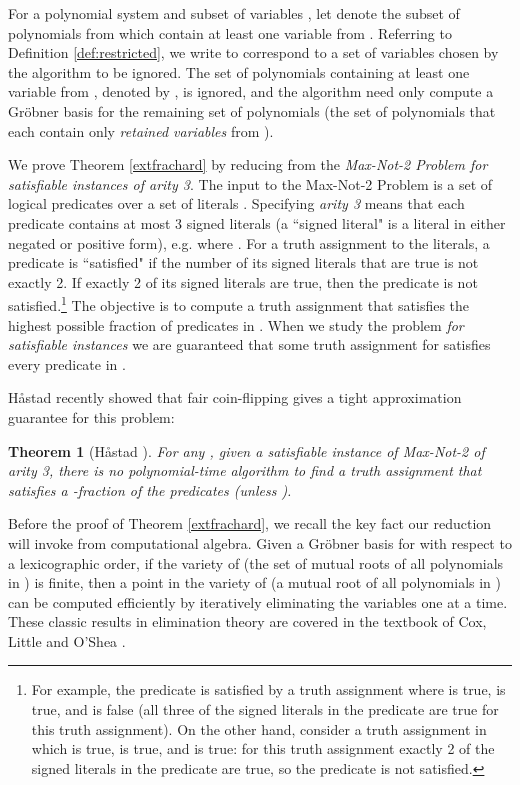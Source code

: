 \documentclass{article}
\newtheorem{thm}{Theorem}
\begin{document}
For a polynomial system  and subset of variables , let  denote the subset of polynomials from  which contain at least one variable from .
Referring to Definition \ref{def:restricted}, we write   to correspond to a set of variables chosen by the algorithm to be ignored. The set of polynomials containing at least one variable from , denoted by , is ignored, and the algorithm need only compute a Gr\"{o}bner basis for the remaining set of polynomials  (the set of polynomials that each contain only \textit{retained variables} from ). 




We prove Theorem \ref{extfrachard} by reducing from the \textit{Max-Not-2 Problem for satisfiable instances of arity 3}. The input to the Max-Not-2 Problem is a set of logical predicates  over a set of literals . Specifying \textit{arity 3} means that each predicate contains at most 3 signed literals (a ``signed literal" is a literal in either negated or positive form), e.g.  where . For a truth assignment to the literals, a predicate is ``satisfied" if the number of its signed literals that are true is not exactly 2. If exactly 2 of its signed literals are true, then the predicate is not satisfied.\footnote{For example, the predicate  is satisfied by a truth assignment where  is true,  is true, and  is false (all three of the signed literals in the predicate are true for this truth assignment). On the other hand, consider a truth assignment in which  is true,  is true, and  is true: for this truth assignment exactly 2 of the signed literals in the predicate are true, so the predicate is not satisfied.} The objective is to compute a truth assignment that satisfies the highest possible fraction of predicates in . When we study the problem \textit{for satisfiable instances} we are guaranteed that some truth assignment for  satisfies every predicate in .

H{\aa}stad recently showed that fair coin-flipping gives a tight approximation guarantee for this problem:
\begin{thm}[H{\aa}stad \cite{hast14}]\label{hastadnot2}
For any , given a satisfiable instance of Max-Not-2 of arity 3, there is no polynomial-time algorithm to find a truth assignment that satisfies a -fraction of the predicates (unless ). 
\end{thm}
\vspace{-1mm}

Before the proof of Theorem \ref{extfrachard}, we recall the key fact our reduction will invoke from computational algebra. Given a Gr\"{o}bner basis for   with respect to a lexicographic order, if the variety of   (the set of mutual roots of all polynomials in ) is finite, then a point in the variety of  (a mutual root of all polynomials in ) can be computed efficiently by iteratively eliminating the variables one at a time. These classic results in elimination theory are covered in the textbook of Cox, Little and O'Shea \cite{cox}.
\end{document}
